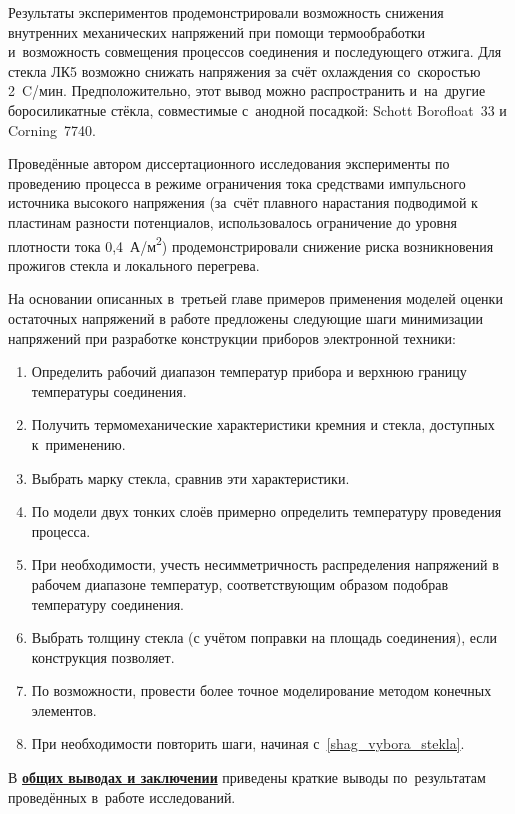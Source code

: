 Результаты экспериментов продемонстрировали возможность снижения внутренних
механических напряжений при помощи термообработки и~возможность совмещения
процессов соединения и последующего отжига. Для стекла ЛК5 возможно снижать
напряжения за счёт охлаждения со~скоростью 2~{\textdegree}C/мин.
Предположительно, этот вывод можно распространить и~на~другие боросиликатные
стёкла, совместимые с~анодной посадкой: Schott Borofloat~33 и Corning~7740.

Проведённые автором диссертационного исследования эксперименты
по проведению процесса в режиме ограничения
тока средствами импульсного источника высокого напряжения (за~счёт
плавного нарастания подводимой к пластинам разности потенциалов,
использовалось ограничение до уровня плотности тока
0,4~А/м{\textsuperscript{2}}) продемонстрировали снижение риска
возникновения прожигов стекла и локального перегрева.

На основании описанных в~третьей главе примеров применения моделей
оценки остаточных напряжений в работе предложены следующие шаги
минимизации напряжений при разработке конструкции приборов
электронной техники:

\begin{enumerate}
    \item Определить рабочий диапазон температур прибора
    и верхнюю границу температуры соединения.
    \item Получить термомеханические характеристики кремния и стекла,
    доступных к~применению.
    \item\label{shag_vybora_stekla} Выбрать марку стекла, сравнив эти
    характеристики.
    \item По модели двух тонких слоёв примерно определить температуру
    проведения процесса.
    \item При необходимости, учесть несимметричность распределения
    напряжений в рабочем диапазоне температур, соответствующим образом
    подобрав температуру соединения.
    \item Выбрать толщину стекла (с учётом поправки на площадь
    соединения), если конструкция позволяет.
    \item По возможности, провести более точное моделирование методом
    конечных элементов.
    \item При необходимости повторить шаги, начиная
    с~\ref{shag_vybora_stekla}.
\end{enumerate}

В \underline{\textbf{общих выводах и заключении}} приведены краткие выводы %
по~результатам проведённых в~работе исследований.

